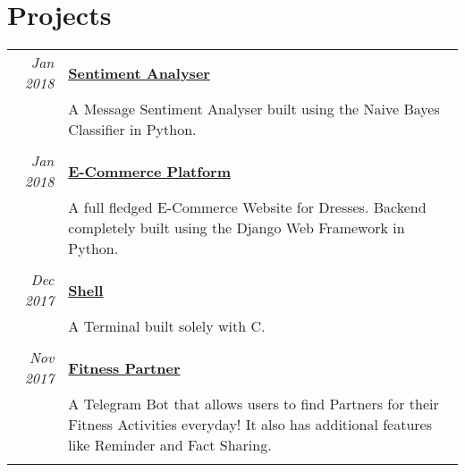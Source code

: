 \documentclass[a4paper,10pt]{article}
\begin{document}
\section{Projects}
\begin{tabular}{r|p{14.5cm}}
 \emph{Jan 2018} & \href{https://sentiment-analyser.yashitm.tech}{\textbf{Sentiment Analyser}} \\&\normalsize{A Message Sentiment Analyser built using the Naive Bayes Classifier in Python.}\\\multicolumn{2}{c}{} \\
 \emph{Jan 2018} & \href{https://github.com/YashitM/E-Commerce-Platform}{\textbf{E-Commerce Platform}} \\&\normalsize{A full fledged E-Commerce Website for Dresses. Backend completely built using the Django Web Framework in Python.}\\\multicolumn{2}{c}{} \\
 \emph{Dec 2017} & \href{https://shell.yashitm.tech}{\textbf{Shell}} \\&\normalsize{A Terminal built solely with C.}\\\multicolumn{2}{c}{} \\
 \emph{Nov 2017} & \href{https://fitnesspartner.yashitm.tech}{\textbf{Fitness Partner}} \\&\normalsize{A Telegram Bot that allows users to find Partners for their Fitness Activities everyday! It also has additional features like Reminder and Fact Sharing.}\\\multicolumn{2}{c}{} \\
\end{tabular}\\
\end{document}
